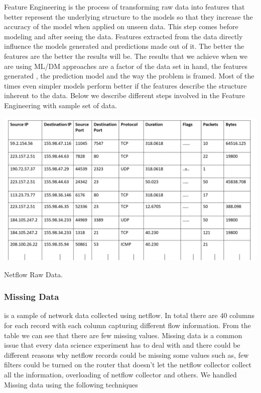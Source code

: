 Feature Engineering is the process of transforming raw
data into features that better represent the underlying structure to the models so that they increase the accuracy of the model when applied on unseen data. This step comes before modeling and after seeing the data.
Features extracted from the data directly influence the models generated and predictions made out of it. The better the features are the better the results will be. The results that we achieve when we are using ML/DM approaches are a factor of the data set in hand, the features generated , the prediction model and the way the problem is framed. Most of the times even simpler models perform better if the features describe the structure inherent to the data. 
Below we describe different steps involved in the Feature Engineering with sample set of data.
\begin{table}[ht]
	\centerline{\includegraphics[scale = 0.4]{raw_data.png}}
	\caption{Netflow Raw Data.}%
\end{table}
 
\subsubsection{Missing Data} 

 is a sample of network data collected using netflow. In total there are 40 columns for each record with each column capturing different flow information. From the table we can see that there are few missing values. Missing data is a common issue that every data science experiment has to deal with and there could be different reasons why netflow records could be missing some values such as, few filters could be turned on the router that doesn't let the netflow collector collect all the information, overloading of netflow collector and others. We handled Missing data using the following techniques 

